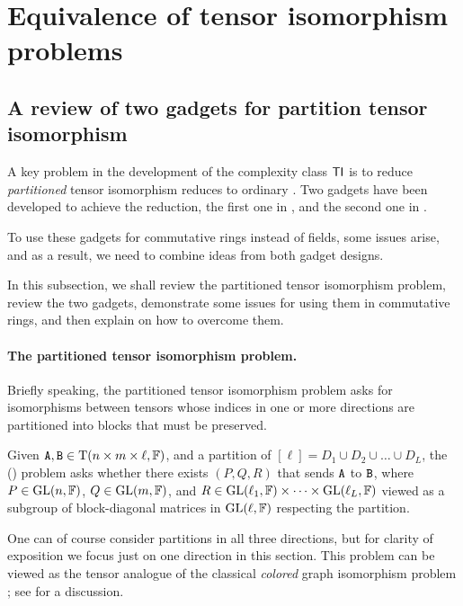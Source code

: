 
\section{Equivalence of tensor isomorphism problems}

\subsection{A review of two gadgets for partition tensor isomorphism}


A key problem in the development of the complexity class $\mathsf{TI}$ is to reduce \emph{partitioned} tensor isomorphism reduces to ordinary \TI \cite{FGS19}. Two gadgets have been developed to achieve the reduction, the first one in \cite{FGS19}, and the second one in \cite{TI4}. 

To use these gadgets for commutative rings instead of fields, some issues arise, and as a result, we need to combine ideas from both gadget designs. 

In this subsection, we shall review the partitioned tensor isomorphism problem, review the two gadgets, demonstrate some issues for using them in commutative rings, and then explain on how to overcome them.

\paragraph{The partitioned tensor isomorphism problem.} Briefly speaking, the partitioned tensor isomorphism problem asks for isomorphisms between tensors whose indices in one or more directions are partitioned into blocks that must be preserved. 

\begin{definition}\label{def:pTI}
	Given $\mathtt{A}, \mathtt{B}\in \mathrm{T}(n\times m\times \ell, \mathbb{F})$, and a partition of $[\ell]=D_1\cup D_2\cup \dots \cup D_L$, the  (\pTI) problem asks whether there exists $(P, Q, R)$ that sends $\mathtt{A}$ to $\mathtt{B}$, where $P\in \mathrm{GL}(n, \mathbb{F})$, $Q\in\mathrm{GL}(m, \mathbb{F})$, and $R\in\mathrm{GL}(\ell_1, \mathbb{F})\times\dots\times\mathrm{GL}(\ell_L, \mathbb{F})$ viewed as a subgroup of block-diagonal matrices in $\mathrm{GL}(\ell, \mathbb{F})$ respecting the partition.
\end{definition}
One can of course consider partitions in all three directions, but for clarity of exposition we focus just on one direction in this section. This problem can be viewed as the tensor analogue of the classical \emph{colored} graph isomorphism problem \cite{KST93}; see \cite{TI4} for a discussion.


